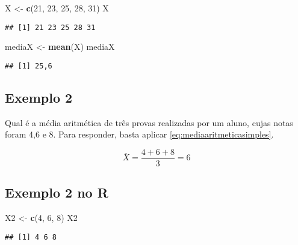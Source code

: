 \documentclass[
]{book}
\newenvironment{Shaded}{\begin{snugshade}}{\end{snugshade}}
\newcommand{\DecValTok}[1]{\textcolor[rgb]{0.00,0.00,0.81}{#1}}
\newcommand{\KeywordTok}[1]{\textcolor[rgb]{0.13,0.29,0.53}{\textbf{#1}}}
\newcommand{\NormalTok}[1]{#1}
\newcommand{\StringTok}[1]{\textcolor[rgb]{0.31,0.60,0.02}{#1}}
\begin{document}
\begin{Shaded}
\begin{Highlighting}[]
\NormalTok{X <-}\StringTok{ }\KeywordTok{c}\NormalTok{(}\DecValTok{21}\NormalTok{, }\DecValTok{23}\NormalTok{, }\DecValTok{25}\NormalTok{, }\DecValTok{28}\NormalTok{, }\DecValTok{31}\NormalTok{)}
\NormalTok{X}
\end{Highlighting}
\end{Shaded}

\begin{verbatim}
## [1] 21 23 25 28 31
\end{verbatim}

\begin{Shaded}
\begin{Highlighting}[]
\NormalTok{mediaX <-}\StringTok{ }\KeywordTok{mean}\NormalTok{(X)}
\NormalTok{mediaX}
\end{Highlighting}
\end{Shaded}

\begin{verbatim}
## [1] 25,6
\end{verbatim}

\hypertarget{exemplo-2}{%
\subsection{Exemplo 2}\label{exemplo-2}}

Qual é a média aritmética de três provas realizadas por um aluno, cujas notas
foram 4,6 e 8. Para responder, basta aplicar \eqref{eq:mediaaritmeticasimples}.

\begin{equation*}
  \overline{X} = \frac{4+6+8}{3} = 6
\end{equation*}

\hypertarget{exemplo-2-no-r}{%
\subsection{Exemplo 2 no R}\label{exemplo-2-no-r}}

\begin{Shaded}
\begin{Highlighting}[]
\NormalTok{X2 <-}\StringTok{ }\KeywordTok{c}\NormalTok{(}\DecValTok{4}\NormalTok{, }\DecValTok{6}\NormalTok{, }\DecValTok{8}\NormalTok{)}
\NormalTok{X2}
\end{Highlighting}
\end{Shaded}

\begin{verbatim}
## [1] 4 6 8
\end{verbatim}
\end{document}
